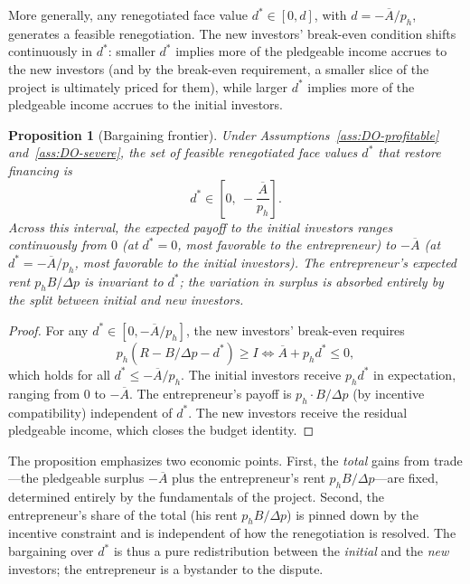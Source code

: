 \documentclass[11pt,a4paper,oneside]{book}
\def\leq{\leqslant}
\def\geq{\geqslant}
\theoremstyle{plain}
\newtheorem{proposition}[theorem]{Proposition}
\theoremstyle{definition}
\theoremstyle{remark}
\numberwithin{equation}{chapter}
\begin{document}
More generally, any renegotiated face value $d^\ast \in [0, d]$, with $d = -\overline{A}/p_h$, generates a feasible renegotiation.
The new investors' break-even condition shifts continuously in $d^\ast$: smaller $d^\ast$ implies more of the pledgeable income accrues to the new investors (and by the break-even requirement, a smaller slice of the project is ultimately priced for them), while larger $d^\ast$ implies more of the pledgeable income accrues to the initial investors.

\begin{proposition}[Bargaining frontier]\label{prop:DO-bargaining}
Under Assumptions~\ref{ass:DO-profitable} and~\ref{ass:DO-severe}, the set of feasible renegotiated face values $d^\ast$ that restore financing is
\begin{equation*}
  d^\ast \in \left[ 0, \ -\frac{\overline{A}}{p_h} \right].
\end{equation*}
Across this interval, the expected payoff to the initial investors ranges continuously from $0$ (at $d^\ast = 0$, most favorable to the entrepreneur) to $-\overline{A}$ (at $d^\ast = -\overline{A}/p_h$, most favorable to the initial investors).
The entrepreneur's expected rent $p_h B / \Delta p$ is \emph{invariant} to $d^\ast$; the variation in surplus is absorbed entirely by the split between initial and new investors.
\end{proposition}

\begin{proof}
For any $d^\ast \in [0, -\overline{A}/p_h]$, the new investors' break-even requires
\begin{equation*}
  p_h(R - B/\Delta p - d^\ast) \geq I \Longleftrightarrow \overline{A} + p_h d^\ast \leq 0,
\end{equation*}
which holds for all $d^\ast \leq -\overline{A}/p_h$.
The initial investors receive $p_h d^\ast$ in expectation, ranging from $0$ to $-\overline{A}$.
The entrepreneur's payoff is $p_h \cdot B/\Delta p$ (by incentive compatibility) independent of $d^\ast$.
The new investors receive the residual pledgeable income, which closes the budget identity.
\end{proof}

The proposition emphasizes two economic points.
First, the \emph{total} gains from trade---the pledgeable surplus $-\overline{A}$ plus the entrepreneur's rent $p_h B / \Delta p$---are fixed, determined entirely by the fundamentals of the project.
Second, the entrepreneur's share of the total (his rent $p_h B / \Delta p$) is pinned down by the incentive constraint and is independent of how the renegotiation is resolved.
The bargaining over $d^\ast$ is thus a pure redistribution between the \emph{initial} and the \emph{new} investors; the entrepreneur is a bystander to the dispute.
\end{document}
